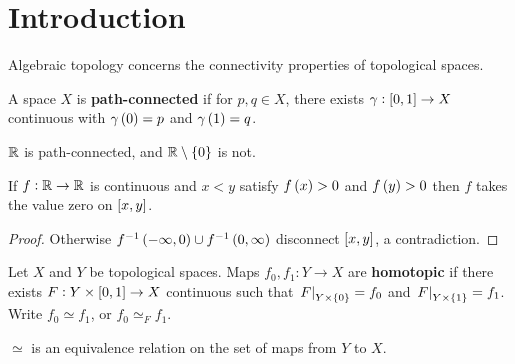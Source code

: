\def\module{Algebraic Topology}
\def\lecturer{Prof Ivan Smith}
\def\term{Michaelmas 2020}
\def\cover{}
\def\syllabus{}
\def\thm{section}



\newcommand{\da}{\partial}
\newcommand{\ext}{\textstyle\bigwedge}
\newcommand{\Hc}{\H_{\ct}}
\newcommand{\pt}{\cbr{\text{point}}}





\section{Introduction}


Algebraic topology concerns the connectivity properties of topological spaces.

\begin{definition*}
A space $ X $ is \textbf{path-connected} if for $ p, q \in X $, there exists $ \gamma : \sbr{0, 1} \to X $ continuous with $ \gamma\br{0} = p $ and $ \gamma\br{1} = q $.
\end{definition*}

\begin{example*}
$ \mathbb{R} $ is path-connected, and $ \RR \setminus \cbr{0} $ is not.
\end{example*}

\begin{corollary}
If $ f : \mathbb{R} \to \mathbb{R} $ is continuous and $ x < y $ satisfy $ f\br{x} > 0 $ and $ f\br{y} > 0 $ then $ f $ takes the value zero on $ \sbr{x, y} $.
\end{corollary}

\begin{proof}
Otherwise $ f^{-1}\br{-\infty, 0} \cup f^{-1}\br{0, \infty} $ disconnect $ \sbr{x, y} $, a contradiction.
\end{proof}

\begin{definition*}
Let $ X $ and $ Y $ be topological spaces. Maps $ f_0, f_1 : Y \to X $ are \textbf{homotopic} if there exists $ F : Y \times \sbr{0, 1} \to X $ continuous such that $ \eval{F}_{Y \times \cbr{0}} = f_0 $ and $ \eval{F}_{Y \times \cbr{1}} = f_1 $. Write $ f_0 \simeq f_1 $, or $ f_0 \simeq_F f_1 $.
\end{definition*}

\begin{exercise*}
$ \simeq $ is an equivalence relation on the set of maps from $ Y $ to $ X $.
\end{exercise*}

